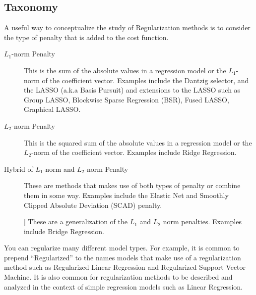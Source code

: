 \begin{bibunit}
\subsection{Taxonomy}
A useful way to conceptualize the study of Regularization methods is to consider the type of penalty that is added to the cost function.

\begin{description}
	\item[$L_1$-norm Penalty] This is the sum of the absolute values in a regression model or the $L_1$-norm of the coefficient vector. Examples include the Dantzig selector, and the LASSO (a.k.a Basis Pursuit) and extensions to the LASSO such as Group LASSO, Blockwise Sparse Regression (BSR), Fused LASSO, Graphical LASSO.
	\item[$L_2$-norm Penalty] This is the squared sum of the absolute values in a regression model or the $L_2$-norm of the coefficient vector. Examples include Ridge Regression.
	\item[Hybrid of $L_1$-norm and $L_2$-norm Penalty] These are methods that makes use of both types of penalty or combine them in some way. Examples include the Elastic Net and Smoothly Clipped Absolute Deviation (SCAD) penalty.
	\item[\item[$L_q$-norm Penalty]] These are a generalization of the $L_1$ and $L_2$ norm penalties. Examples include Bridge Regression.
\end{description}


You can regularize many different model types. For example, it is common to prepend ``Regularized'' to the names models that make use of a regularization method such as Regularized Linear Regression and Regularized Support Vector Machine. It is also common for regularization methods to be described and analyzed in the context of simple regression models such as Linear Regression.


\putbib
\end{bibunit}

\newpage\begin{bibunit}\putbib\end{bibunit}
\newpage\begin{bibunit}\putbib\end{bibunit}
\newpage\begin{bibunit}\putbib\end{bibunit}
